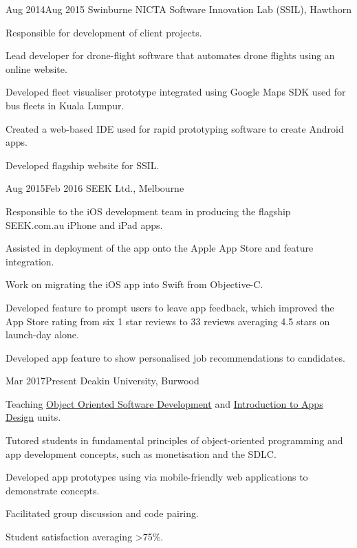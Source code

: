 {Aug 2014}{Aug 2015}
{Swinburne NICTA Software Innovation Lab (SSIL), Hawthorn}
{
  \item Responsible for development of client projects.
}
{
  \item Lead developer for drone-flight software that automates drone flights using an online website.
  \item Developed fleet visualiser prototype integrated using Google Maps SDK used for bus fleets in Kuala Lumpur.
  \item Created a web-based IDE used for rapid prototyping software to create Android apps.
  \item Developed flagship website for SSIL.
}

{Aug 2015}{Feb 2016}
{SEEK Ltd., Melbourne}
{
  \item Responsible to the iOS development team in producing the flagship SEEK.com.au iPhone and iPad apps.
  \item Assisted in deployment of the app onto the Apple App Store and feature integration.
  \item Work on migrating the iOS app into Swift from Objective-C.
}
{
  \item Developed feature to prompt users to leave app  feedback, which improved the App Store rating from six 1 star reviews to 33 reviews averaging 4.5 stars on launch-day alone.
  \item Developed app feature to show personalised job recommendations to candidates.
}

{Mar 2017}{Present}
{Deakin University, Burwood}
{\item Teaching \href{http://www.deakin.edu.au/current-students-courses/unit.php?unit=SIT232}{Object Oriented Software Development} and \href{http://www.deakin.edu.au/current-students-courses/unit.php?unit=SIT120}{Introduction to Apps Design} units.
  \item Tutored students in fundamental principles of object-oriented programming and app development concepts, such as monetisation and the SDLC.
}
{
  \item Developed app prototypes using via mobile-friendly web applications to demonstrate concepts.
  \item Facilitated group discussion and code pairing.
  \item Student satisfaction averaging >75\%.
}

